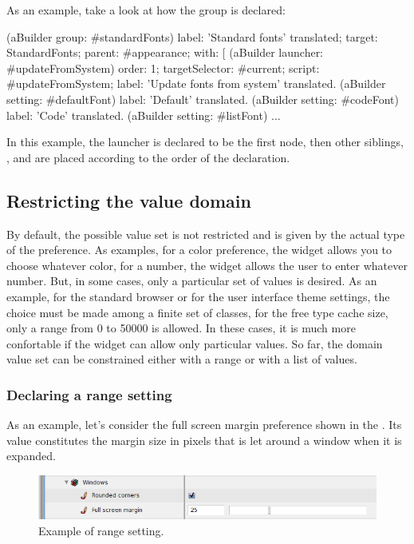 \documentclass[a4paper,10pt,twoside]{book}
\begin{document}
As an example, take a look at how the  group is declared:
\begin{code}{}
(aBuilder group: #standardFonts)
	label: 'Standard fonts' translated;
	target: StandardFonts;
	parent: #appearance;
	with: [ 
		(aBuilder launcher: #updateFromSystem)
			order: 1; 
			targetSelector: #current;
			script: #updateFromSystem;
			label: 'Update fonts from system' translated.
		(aBuilder setting: #defaultFont)
			label: 'Default' translated.
		(aBuilder setting: #codeFont) 
			label: 'Code' translated.
		(aBuilder setting: #listFont)
...
\end{code}
In this example, the launcher  is declared to be the first node, then other siblings, ,  and  are placed according to the order of the declaration.

\subsection{Restricting the value domain}
By default, the possible value set is not restricted and is given by the actual type of the preference. As examples, for a color preference, the widget allows you to choose whatever color, for a number, the widget allows the user to enter whatever number.
But, in some cases, only a particular set of values is desired. As an example, for the standard browser or for the user interface theme settings, the choice must be made among a finite set of classes, for the free type cache size, only a range from 0 to 50000 is allowed. In these cases, it is much more confortable if the widget can allow only particular values. So far, the domain value set can be constrained either with a range or with a list of values.

\subsubsection{Declaring a range setting}
As an example, let's consider the full screen margin preference shown in the . Its value constitutes the margin size in pixels that is let around a window when it is expanded. 

\begin{figure}[tbh]
\begin{center}
\includegraphics[scale=0.38]{fullScreenMargin}
\caption{Example of range setting.}
\end{center}
\end{figure}
\end{document}
